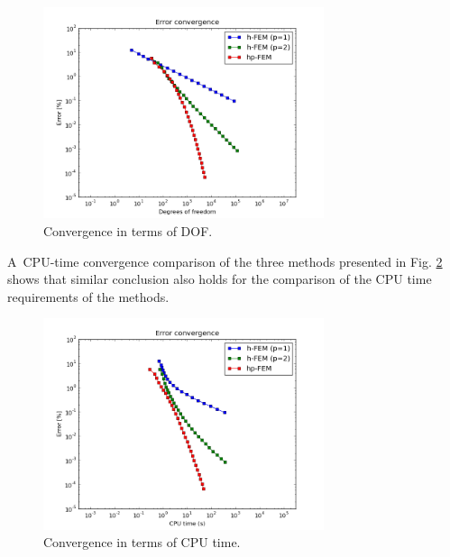 \documentclass[final,3p,times,twocolumn]{elsarticle}
\begin{document}
\begin{figure}[!ht]
\begin{center}
\includegraphics[height=6.2cm]{lshape-conv-dof.png}
\end{center}
\vspace{-8mm}
\caption{Convergence in terms of DOF.}
\label{fig:smooth-iso-5}
\end{figure}


A~CPU-time convergence comparison of the three methods 
presented in Fig. \ref{fig:smooth-iso-6} shows that 
similar conclusion also holds for the comparison of the CPU 
time requirements of the methods.

\begin{figure}[!ht]
\begin{center}
\includegraphics[height=6.2cm]{lshape-conv-cpu.png}
\end{center}
\vspace{-8mm}
\caption{Convergence in terms of CPU time.}
\label{fig:smooth-iso-6}
\end{figure}
\end{document}
